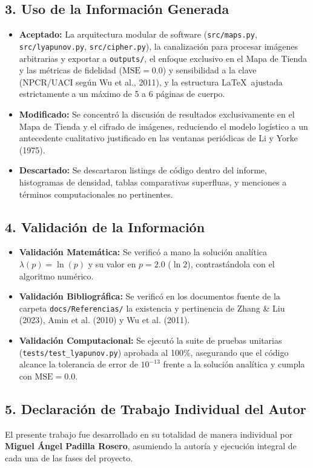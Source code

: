\documentclass[11pt,letterpaper]{article}
\begin{document}
\subsection*{3. Uso de la Información Generada}
\begin{itemize}
    \item \textbf{Aceptado:} La arquitectura modular de software (\texttt{src/maps.py}, \texttt{src/lyapunov.py}, \texttt{src/cipher.py}), la canalización para procesar imágenes arbitrarias y exportar a \texttt{outputs/}, el enfoque exclusivo en el Mapa de Tienda y las métricas de fidelidad ($\text{MSE}=0.0$) y sensibilidad a la clave (NPCR/UACI según Wu et al., 2011), y la estructura \LaTeX\ ajustada estrictamente a un máximo de 5 a 6 páginas de cuerpo.
    \item \textbf{Modificado:} Se concentró la discusión de resultados exclusivamente en el Mapa de Tienda y el cifrado de imágenes, reduciendo el modelo logístico a un antecedente cualitativo justificado en las ventanas periódicas de Li y Yorke (1975).
    \item \textbf{Descartado:} Se descartaron listings de código dentro del informe, histogramas de densidad, tablas comparativas superfluas, y menciones a términos computacionales no pertinentes.
\end{itemize}

\subsection*{4. Validación de la Información}
\begin{itemize}
    \item \textbf{Validación Matemática:} Se verificó a mano la solución analítica $\lambda(p) = \ln(p)$ y su valor en $p=2.0$ ($\ln 2$), contrastándola con el algoritmo numérico.
    \item \textbf{Validación Bibliográfica:} Se verificó en los documentos fuente de la carpeta \texttt{docs/Referencias/} la existencia y pertinencia de Zhang \& Liu (2023), Amin et al. (2010) y Wu et al. (2011).
    \item \textbf{Validación Computacional:} Se ejecutó la suite de pruebas unitarias (\texttt{tests/test\_lyapunov.py}) aprobada al 100\%, asegurando que el código alcance la tolerancia de error de $10^{-13}$ frente a la solución analítica y cumpla con $\text{MSE}=0.0$.
\end{itemize}

\subsection*{5. Declaración de Trabajo Individual del Autor}
El presente trabajo fue desarrollado en su totalidad de manera individual por \textbf{Miguel Ángel Padilla Rosero}, asumiendo la autoría y ejecución integral de cada una de las fases del proyecto.
\end{document}
